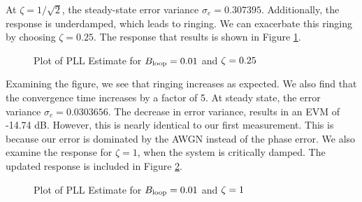 \documentclass{article}
\begin{document}
\noindent At $\zeta = 1/\sqrt{2}$, the steady-state error variance $\sigma_e=0.307395$. Additionally, the response is underdamped, which leads to ringing. We can exacerbate this ringing by choosing $\zeta=0.25$. The response that results is shown in Figure \ref{fig::convergence_Bloop_0p01_damp_0p25}.

\begin{figure}[H]
	\centerline{}
	\caption{Plot of PLL Estimate for $\protect{B_\text{loop}} = 0.01$ and $\protect{\zeta = 0.25}$}
	\label{fig::convergence_Bloop_0p01_damp_0p25}
\end{figure}

\noindent Examining the figure, we see that ringing increases as expected. We also find that the convergence time increases by a factor of 5. At steady state, the error variance $\sigma_e=0.0303656$. The decrease in error variance, results in an EVM of -14.74 dB. However, this is nearly identical to our first measurement. This is because our error is dominated by the AWGN instead of the phase error. We also examine the response for $\zeta = 1$, when the system is critically damped. The updated response is included in Figure \ref{fig::convergence_Bloop_0p01_damp_1}.

\begin{figure}[H]
	\centerline{}
	\caption{Plot of PLL Estimate for $\protect{B_\text{loop}} = 0.01$ and $\protect{\zeta = 1}$}
	\label{fig::convergence_Bloop_0p01_damp_1}
\end{figure}
\end{document}
